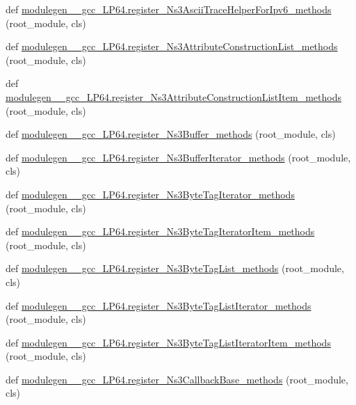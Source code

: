 \begin{DoxyCompactItemize}
\item 
def \hyperlink{namespacemodulegen____gcc__LP64_ab2ef07b6cb102bd3f3af51de6c4b0366}{modulegen\+\_\+\+\_\+gcc\+\_\+\+L\+P64.\+register\+\_\+\+Ns3\+Ascii\+Trace\+Helper\+For\+Ipv6\+\_\+methods} (root\+\_\+module, cls)
\item 
def \hyperlink{namespacemodulegen____gcc__LP64_a4dea76fc9218ba239313d01e5ac1d4cd}{modulegen\+\_\+\+\_\+gcc\+\_\+\+L\+P64.\+register\+\_\+\+Ns3\+Attribute\+Construction\+List\+\_\+methods} (root\+\_\+module, cls)
\item 
def \hyperlink{namespacemodulegen____gcc__LP64_a897162c4bcad09fae06079f3c1b24777}{modulegen\+\_\+\+\_\+gcc\+\_\+\+L\+P64.\+register\+\_\+\+Ns3\+Attribute\+Construction\+List\+Item\+\_\+methods} (root\+\_\+module, cls)
\item 
def \hyperlink{namespacemodulegen____gcc__LP64_ad545f8eb2320e09bf6e5be02690b4eaa}{modulegen\+\_\+\+\_\+gcc\+\_\+\+L\+P64.\+register\+\_\+\+Ns3\+Buffer\+\_\+methods} (root\+\_\+module, cls)
\item 
def \hyperlink{namespacemodulegen____gcc__LP64_a219f36a56f22b6e50de65d276cdf742d}{modulegen\+\_\+\+\_\+gcc\+\_\+\+L\+P64.\+register\+\_\+\+Ns3\+Buffer\+Iterator\+\_\+methods} (root\+\_\+module, cls)
\item 
def \hyperlink{namespacemodulegen____gcc__LP64_ae692c5fa47566ed6b225ae5a5ca35235}{modulegen\+\_\+\+\_\+gcc\+\_\+\+L\+P64.\+register\+\_\+\+Ns3\+Byte\+Tag\+Iterator\+\_\+methods} (root\+\_\+module, cls)
\item 
def \hyperlink{namespacemodulegen____gcc__LP64_ade2c2970e32bf8b776b3624afcc4082d}{modulegen\+\_\+\+\_\+gcc\+\_\+\+L\+P64.\+register\+\_\+\+Ns3\+Byte\+Tag\+Iterator\+Item\+\_\+methods} (root\+\_\+module, cls)
\item 
def \hyperlink{namespacemodulegen____gcc__LP64_ad929f8749eef52cadc734fee358cacd9}{modulegen\+\_\+\+\_\+gcc\+\_\+\+L\+P64.\+register\+\_\+\+Ns3\+Byte\+Tag\+List\+\_\+methods} (root\+\_\+module, cls)
\item 
def \hyperlink{namespacemodulegen____gcc__LP64_aa7b7804ddcf3a3b4d83820f193414ea4}{modulegen\+\_\+\+\_\+gcc\+\_\+\+L\+P64.\+register\+\_\+\+Ns3\+Byte\+Tag\+List\+Iterator\+\_\+methods} (root\+\_\+module, cls)
\item 
def \hyperlink{namespacemodulegen____gcc__LP64_a262c89a667105a6a7bc764058f464ab3}{modulegen\+\_\+\+\_\+gcc\+\_\+\+L\+P64.\+register\+\_\+\+Ns3\+Byte\+Tag\+List\+Iterator\+Item\+\_\+methods} (root\+\_\+module, cls)
\item 
def \hyperlink{namespacemodulegen____gcc__LP64_a911c07db6d52106940012fbb077a0853}{modulegen\+\_\+\+\_\+gcc\+\_\+\+L\+P64.\+register\+\_\+\+Ns3\+Callback\+Base\+\_\+methods} (root\+\_\+module, cls)

\end{DoxyCompactItemize}
